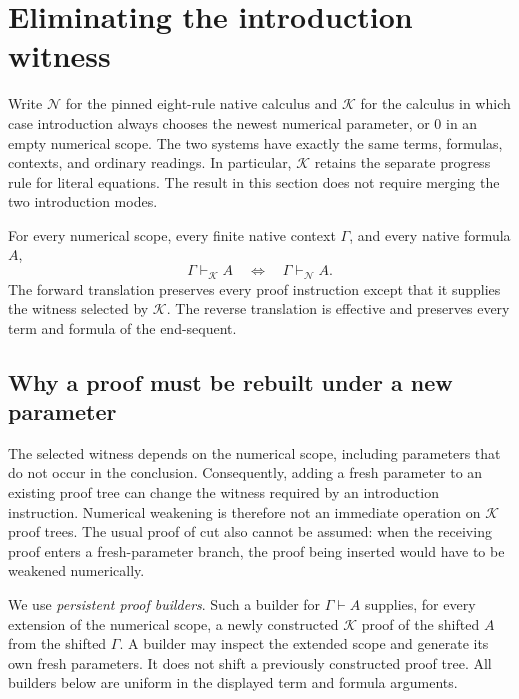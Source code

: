 \section{Eliminating the introduction witness}
\label{sec:logical-proof}

Write $\mathcal N$ for the pinned eight-rule native calculus and
$\mathcal K$ for the calculus in which case introduction always chooses
the newest numerical parameter, or $0$ in an empty numerical scope.
The two systems have exactly the same terms, formulas, contexts, and
ordinary readings. In particular, $\mathcal K$ retains the separate
progress rule for literal equations. The result in this section does not
require merging the two introduction modes.

\begin{theorem}
\label{thm:newest-equivalence}
For every numerical scope, every finite native context $\Gamma$, and
every native formula $A$,
\[
 \Gamma\vdash_{\mathcal K} A
 \quad\Longleftrightarrow\quad
 \Gamma\vdash_{\mathcal N} A.
\]
The forward translation preserves every proof instruction except that
it supplies the witness selected by $\mathcal K$. The reverse translation
is effective and preserves every term and formula of the end-sequent.
\end{theorem}

\subsection{Why a proof must be rebuilt under a new parameter}

The selected witness depends on the numerical scope, including parameters
that do not occur in the conclusion. Consequently, adding a fresh parameter
to an existing proof tree can change the witness required by an introduction
instruction. Numerical weakening is therefore not an immediate operation on
$\mathcal K$ proof trees. The usual proof of cut also cannot be assumed:
when the receiving proof enters a fresh-parameter branch, the proof being
inserted would have to be weakened numerically.

We use \emph{persistent proof builders}. Such a builder for
$\Gamma\vdash A$ supplies, for every extension of the numerical scope,
a newly constructed $\mathcal K$ proof of the shifted $A$ from the shifted
$\Gamma$. A builder may inspect the extended scope and generate its own
fresh parameters. It does not shift a previously constructed proof tree.
All builders below are uniform in the displayed term and formula arguments.

